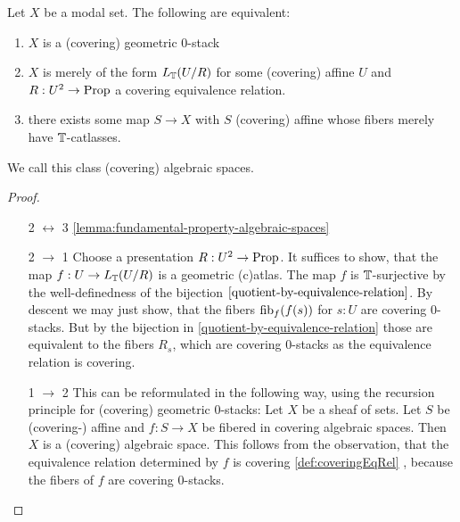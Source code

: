 %
\begin{theorem}
	Let $X$ be a modal set. The following are equivalent:
	\begin{enumerate}
		\item $X$ is a (covering) geometric 0-stack
		\item $X$ is merely of the form $L_{\mathbb{T}} (U / R)$ for some (covering) affine $U$ and  $R : U^2 \to \operatorname{Prop}$ a covering equivalence relation. 
		\item there exists some map $S \to X$ with $S$ (covering) affine whose fibers merely have $\mathbb{T}$-catlasses.
	\end{enumerate}
	We call this class (covering) algebraic spaces.
\end{theorem}
\begin{proof}
\ 	\begin{enumerate}
	\item [2 $\leftrightarrow$ 3]
		\ref {lemma:fundamental-property-algebraic-spaces}
	\item [2 $\to$ 1]
	Choose a presentation $ R: U^2 \to \operatorname{Prop}$.
	It suffices to show, that the map $f : U \to L_{\mathbb{T}} ( U / R)$ is a geometric (c)atlas. The map $f$ is $\mathbb{T}$-surjective by the well-definedness of the bijection $\ref{quotient-by-equivalence-relation}$. By descent we may just show, that the fibers $\operatorname{fib}_f (f(s))$ for $s : U$ are covering 0-stacks. But by the bijection in \ref{quotient-by-equivalence-relation} those are equivalent to the fibers $R_s$, which are covering 0-stacks as the equivalence relation is covering. \\
	\item [1 $\to$ 2]
	This can be reformulated in the following way, using the recursion principle for (covering) geometric 0-stacks:
	Let $X$ be a sheaf of sets. Let $S$ be (covering-) affine and $f : S \to X$ be fibered in covering algebraic spaces. Then $X$ is a (covering) algebraic space.
This follows from the observation, that the equivalence relation determined by $f$ is covering \ref{def:coveringEqRel} , because the fibers of $f$ are covering 0-stacks.
	\end{enumerate}
\end{proof}
